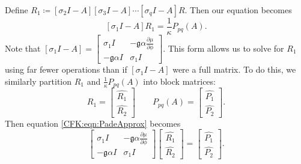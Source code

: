 \documentclass{csri19}
\newcommand{\CFKg}{\mathfrak{g}}
\begin{document}
Define $R_1 \coloneqq \left[\sigma_2I-A\right]\left[\sigma_3I-A\right]
\cdots\left[\sigma_qI-A\right]R$. Then our equation becomes
\begin{equation}\label{CFK:eqn:PadeApprox} \left[\sigma_1I-A\right]R_1 
= \frac{1}{\kappa}P_{pq}(A).\end{equation} Note that 
$\left[\sigma_1I-A\right] =
 \begin{bmatrix} \sigma_1 I  & -\CFKg\alpha \frac{\partial\mu}{\partial\phi} \\
 -\CFKg\alpha I            & \sigma_1 I \end{bmatrix}.$ This form allows 
us to solve for $R_1$ using far fewer operations than if 
$\left[\sigma_1I-A\right]$ were a full matrix. To do this, we similarly 
partition $R_1$ and $\frac{1}{\kappa}P_{pq}(A)$ into block matrices: 
\[ R_1 = \begin{bmatrix} \hat{R_1} \\ \hat{R_2}\end{bmatrix} \qquad P_{pq}(A)
 = \begin{bmatrix} \hat{P_1} \\ \hat{P_2}\end{bmatrix}.\]
Then equation \ref{CFK:eqn:PadeApprox} becomes 
\[\begin{bmatrix} \sigma_1 I  & -\CFKg\alpha \frac{\partial\mu}{\partial\phi} \\
           -\CFKg\alpha I & \sigma_1 I \end{bmatrix}
\begin{bmatrix} \hat{R_1} \\
 \hat{R_2} \end{bmatrix} = 
\begin{bmatrix} \hat{P_1} \\
 \hat{P_2} \end{bmatrix}.\]
\end{document}
